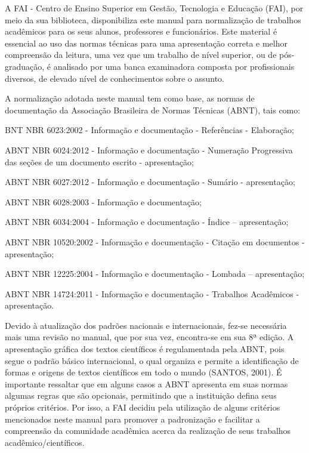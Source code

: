 \documentclass[a4paper,12pt]{article}  %
\begin{document}
\begin{ElementosTextuais}

\begin{Introducao} %
A FAI - Centro de Ensino Superior em Gestão, Tecnologia e Educação (FAI), por meio da sua biblioteca, disponibiliza este manual para normalização de trabalhos acadêmicos para os seus alunos, professores e funcionários. Este material é essencial ao uso das normas técnicas para uma apresentação correta e melhor compreensão da leitura, uma vez que um trabalho de nível superior, ou de pós-graduação, é analisado por uma banca examinadora composta por profissionais diversos, de elevado nível de conhecimentos sobre o assunto.

A normalização adotada neste manual tem como base, as normas de documentação da Associação Brasileira de Normas Técnicas (ABNT), tais como:
\begin{alinea}
    \item BNT NBR 6023:2002 - Informação e documentação - Referências - Elaboração;
    \item ABNT NBR 6024:2012 - Informação e documentação - Numeração Progressiva das
seções de um documento escrito - apresentação;
    \item ABNT NBR 6027:2012 - Informação e documentação - Sumário - apresentação;
    \item ABNT NBR 6028:2003 - Informação e documentação;
    \item ABNT NBR 6034:2004 - Informação e documentação - Índice – apresentação;
    \item ABNT NBR 10520:2002 - Informação e documentação - Citação em documentos -
apresentação;
    \item ABNT NBR 12225:2004 - Informação e documentação - Lombada – apresentação;
    \item ABNT NBR 14724:2011 - Informação e documentação - Trabalhos Acadêmicos -
apresentação.
\end{alinea}

Devido à atualização dos padrões nacionais e internacionais, fez-se necessária mais uma revisão no manual, que por sua vez, encontra-se em sua 8ª edição. A apresentação gráfica dos textos científicos é regulamentada pela ABNT, pois segue o padrão básico internacional, o qual organiza e permite a identificação de formas e origens de textos científicos em todo o mundo (SANTOS, 2001). É importante ressaltar que em alguns casos a ABNT apresenta em suas normas algumas regras que são opcionais, permitindo que a instituição defina seus próprios critérios. Por isso, a FAI decidiu pela utilização de alguns critérios mencionados neste manual para promover a padronização e facilitar a compreensão da comunidade acadêmica acerca da realização de seus trabalhos acadêmico/científicos.


\end{Introducao}
\end{ElementosTextuais}
\end{document}
